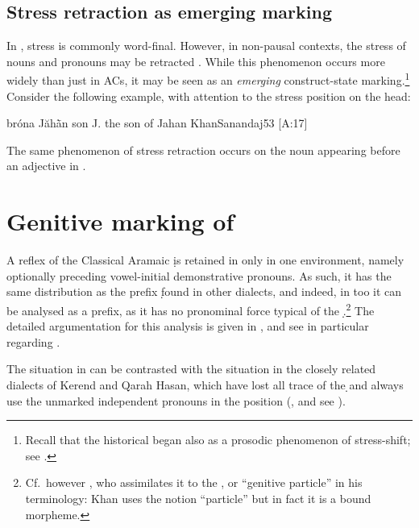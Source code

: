 \subsection {Stress retraction as emerging  marking} \label{ss:JSan_cst_stress}

In \JSan, stress is commonly word-final. However, in non-pausal contexts, the stress of nouns and pronouns may be retracted \citep[53]{KhanSanandaj}. While this phenomenon occurs more widely than just in ACs, it may be seen as an \textit{emerging} construct-state marking.\footnote{Recall that the historical  \cst* began also as a prosodic phenomenon of stress-shift; see .} Consider the following example, with attention to the stress position on the head:

{bróna Jăhā̀n}
{son J.}
{the son of Jahan}
{KhanSanandaj}{53 {[A:17]}}

The same phenomenon of stress retraction occurs on the noun  appearing before an adjective in .



\section{Genitive marking of \secns} \label{ss:JSan_gen}

A reflex of the Classical Aramaic \lnk* \d is retained in \JSan only in one  environment, namely optionally preceding  vowel-initial demonstrative pronouns. As such, it has the same distribution as the \gen* prefix \d found in other dialects, and indeed, in \JSan too it can be analysed as a \gen* prefix, as it has no pronominal force typical of the \lnk* \d.\footnote{Cf.\ however \citet[200]{KhanSanandaj}, who assimilates it to the \lnk*, or \enquote{genitive particle} in his terminology:  Khan uses the notion \enquote{particle} but in fact it is a bound morpheme.} The detailed argumentation for this analysis is given in , and see in particular  regarding \JSan.

The situation in \JSan can be contrasted with the situation in the closely related dialects of Kerend and Qarah Hasan, which have lost all trace of the \d \lnk* and always use the unmarked independent pronouns in the \secn position (\cite[11]{KhanSanandaj}, and see ). 
 

